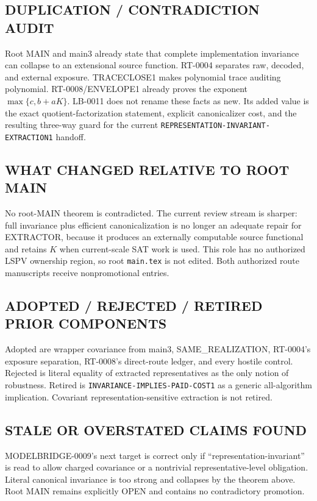 \documentclass[11pt]{article}
\begin{document}
\subsection*{DUPLICATION / CONTRADICTION AUDIT}
Root MAIN and main3 already state that complete implementation invariance can
collapse to an extensional source function.  RT-0004 separates raw, decoded,
and external exposure.  TRACECLOSE1 makes polynomial trace auditing
polynomial.  RT-0008/ENVELOPE1 already proves the exponent
$\max\{c,b+aK\}$.  LB-0011 does not rename these facts as new.  Its added
value is the exact quotient-factorization statement, explicit canonicalizer
cost, and the resulting three-way guard for the current
\texttt{REPRESENTATION-INVARIANT-EXTRACTION1} handoff.

\subsection*{WHAT CHANGED RELATIVE TO ROOT MAIN}
No root-MAIN theorem is contradicted.  The current review stream is sharper:
full invariance plus efficient canonicalization is no longer an adequate
repair for EXTRACTOR, because it produces an externally computable source
functional and retains $K$ when current-scale SAT work is used.  This role
has no authorized LSPV ownership region, so root \texttt{main.tex} is not
edited.  Both authorized route manuscripts receive nonpromotional entries.

\subsection*{ADOPTED / REJECTED / RETIRED PRIOR COMPONENTS}
Adopted are wrapper covariance from main3, SAME\_REALIZATION, RT-0004's
exposure separation, RT-0008's direct-route ledger, and every hostile control.
Rejected is literal equality of extracted representatives as the only notion
of robustness.  Retired is \texttt{INVARIANCE-IMPLIES-PAID-COST1} as a generic
all-algorithm implication.  Covariant representation-sensitive extraction is
not retired.

\subsection*{STALE OR OVERSTATED CLAIMS FOUND}
MODELBRIDGE-0009's next target is correct only if
``representation-invariant'' is read to allow charged covariance or a
nontrivial representative-level obligation.  Literal canonical invariance is
too strong and collapses by the theorem above.  Root MAIN remains explicitly
OPEN and contains no contradictory promotion.
\end{document}
